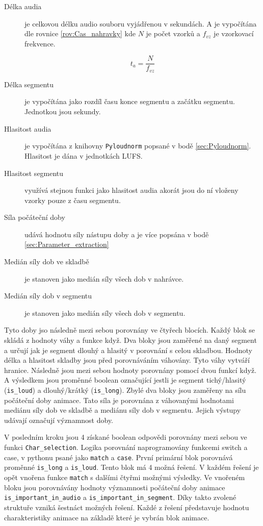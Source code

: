 \begin{description}
    \item[Délka audia] je celkovou délku audio souboru vyjádřenou v sekundách. A je vypočítána dle rovnice \ref{rov:Cas_nahravky} kde $N$ je počet vzorků a $f_{vz}$ je vzorkovací frekvence. 

    \begin{equation}
        t_{a} = \frac{N}{f_{vz}}
        \label{rov:Cas_nahravky}
    \end{equation}

    \item[Délka segmentu] je vypočítána jako rozdíl času konce segmentu a začátku segmentu. Jednotkou jsou sekundy. 
    \item[Hlasitost audia] je vypočítána z knihovny \texttt{Pyloudnorm} popsané v bodě \ref{sec:Pyloudnorm}. Hlasitost je dána v jednotkách LUFS.
    \item[Hlasitost segmentu] využívá stejnou funkci jako hlasitost audia akorát jsou do ní vloženy vzorky pouze z času segmentu. 
    \item[Síla počáteční doby] udává hodnotu síly nástupu doby a je více popsána v bodě \ref{sec:Parameter_extraction}
    \item[Medián síly dob ve skladbě] je stanoven jako medián síly všech dob v nahrávce. 
    \item[Medián síly dob v segmentu] je stanoven jako medián  síly všech dob v segmentu. 
\end{description}
Tyto doby jso následně mezi sebou porovnány ve čtyřech blocích. Každý blok se skládá z hodnoty váhy a funkce když. Dva bloky jsou zaměřené na daný segment a určují jak je segment dlouhý a hlasitý v porovnání s celou skladbou. Hodnoty délka a hlasitost skladby jsou před porovnáváním váhovány. Tyto váhy vytváří hranice. Následně jsou mezi sebou hodnoty porovnány pomocí dvou funkcí když. A výsledkem jsou proměnné boolean označující jestli je segment tichý/hlasitý (\texttt{is\_loud}) a dlouhý/krátký (\texttt{is\_long}). Zbylé dva bloky jsou zaměřeny na sílu počáteční doby animace. Tato síla je porovnána z váhovanými hodnotami mediánu síly dob ve skladbě a mediánu síly dob v segmentu. Jejich výstupy udávají označují významnost doby. 

V posledním kroku jsou 4 získané boolean odpovědi porovnány mezi sebou ve funkci \texttt{Char\_selection}. Logika porovnání naprogramovány funkcemi switch a case, v pythonu psané jako \texttt{match} a \texttt{case}. První primární blok porovnává proměnné \texttt{is\_long} a \texttt{is\_loud}. Tento blok má 4 možná řešení. V každém řešení je opět vnořena funkce \texttt{match} s dalšími čtyřmi možnými výsledky. Ve vnořeném bloku jsou porovnávány hodnoty významnosti počáteční doby animace \texttt{is\_important\_in\_audio} a \texttt{is\_important\_in\_segment}. Díky takto zvolené struktuře vzniká šestnáct možných řešení. Každé z řešení představuje hodnotu charakteristiky animace na základě které je vybrán blok animace. 

